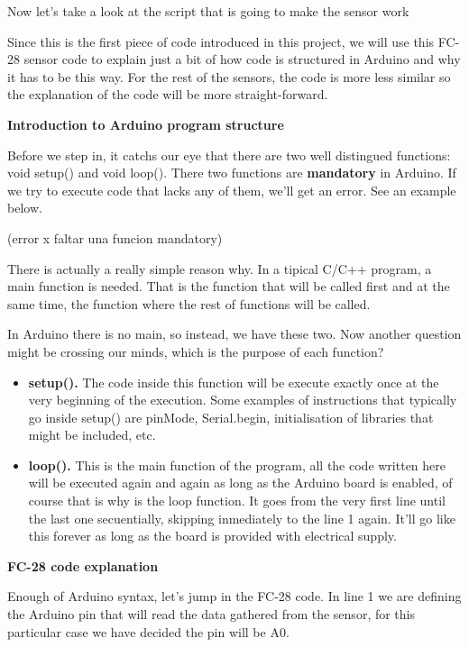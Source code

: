 Now let's take a look at the script that is going to make the sensor work



Since this is the first piece of code introduced in this project, we will use this FC-28 sensor code to explain just a bit of how code is structured in Arduino and why it has to be this way. For the rest of the sensors, the code is more less similar so the explanation of the code will be more straight-forward.

\vspace{7mm}
\textbf{Introduction to Arduino program structure}

Before we step in, it catchs our eye that there are two well distingued functions: void setup() and void loop(). There two functions are \textbf{mandatory} in Arduino. If we try to execute code that lacks any of them, we'll get an error. See an example below.

(error x faltar una funcion mandatory)

There is actually a really simple reason why. In a tipical C/C++ program, a main function is needed. That is the function that will be called first and at the same time, the function where the rest of functions will be called.

In Arduino there is no main, so instead, we have these two. Now another question might be crossing our minds, which is the purpose of each function?

\begin{itemize}
	\item \textbf{setup().} The code inside this function will be execute exactly once at the very beginning of the execution. Some examples of instructions that typically go inside setup() are pinMode, Serial.begin, initialisation of libraries that might be included, etc.
	\item \textbf{loop().} This is the main function of the program, all the code written here will be executed again and again as long as the Arduino board is enabled, of course that is why is the loop function. It goes from the very first line until the last one secuentially, skipping inmediately to the line 1 again. It'll go like this forever as long as the board is provided with electrical supply.
\end{itemize}

\newpage

\textbf{FC-28 code explanation}

Enough of Arduino syntax, let's jump in the FC-28 code. In line 1 we are defining the Arduino pin that will read the data gathered from the sensor, for this particular case we have decided the pin will be A0.

